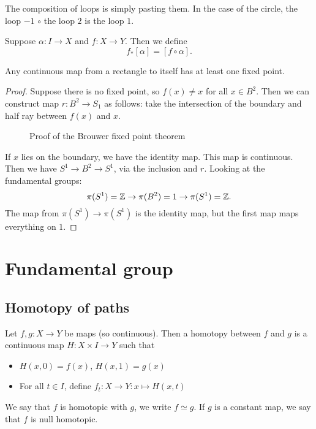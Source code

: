 The composition of loops is simply pasting them.
In the case of the circle, the loop $-1$  $\circ$ the loop  $2$ is the loop $1$.

Suppose $\alpha: I \to  X$ and $f : X\to Y$. Then we define 
\[
    f_*[\alpha] = [f \circ \alpha]
.\] 


\begin{theorem}
    Any continuous map from a rectangle to itself has at least one fixed point.
\end{theorem}
\begin{proof}
    Suppose there is no fixed point, so $f(x) \neq x$ for all  $x \in B^2$.
    Then we can construct map $r : B^2 \to  S_1$ as follows:
    take the intersection of the boundary and half ray between $f(x)$ and $x$.
    \begin{figure}[H]
        \centering
        \caption{Proof of the Brouwer fixed point theorem}
        \label{fig:proof-fixed-point-brouwer}
    \end{figure}
    If $x$ lies on the boundary, we have the identity map.
    This map is continuous.
    Then we have $S^1 \to B^2 \to S^1$, via the inclusion and $r$.
    Looking at the fundamental groups:
    \[
        \pi(S^1)  =\mathbb{Z} \to  \pi(B^2) = 1 \to  \pi(S^1) = \mathbb{Z}
    .\] 
    The map from $\pi(S^1) \to  \pi(S^{1})$ is the identity map, but the first map maps everything on $1$. \phantom\qedhere\hfill\contra 
\end{proof}



\setcounter{chapter}{1}
\chapter{Fundamental group}

\setcounter{section}{50}
\section{Homotopy of paths}
\begin{definition}[Homotopy]
    Let $f,g:X\to Y$ be maps (so continuous). Then a homotopy between $f$ and $g$ is a continuous map $H: X\times I \to Y$ such that
    \begin{itemize}
        \item $H(x, 0) = f(x)$, $H(x, 1) = g(x)$ 
        \item For all $t \in I$, define $f_t: X \to  Y: x \mapsto  H(x, t)$
    \end{itemize}
    We say that $f$ is homotopic with $g$, we write $f \simeq g$.
    If $g$ is a constant map, we say that $f$ is null homotopic.
\end{definition}

